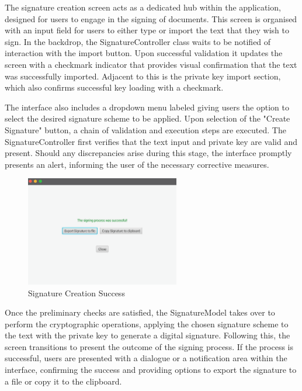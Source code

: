 \documentclass[]{final_report}
\theoremstyle{definition}
\begin{document}
The signature creation screen acts as a dedicated hub within the application, designed for users to engage in the signing of documents. This screen is organised with an input field for users to either type or import the text that they wish to sign. In the backdrop, the SignatureController class waits to be notified of interaction with the import button. Upon successful validation it updates the screen with a checkmark indicator that provides visual confirmation that the text was successfully imported. Adjacent to this is the private key import section, which also confirms successful key loading with a checkmark. 

The interface also includes a dropdown menu labeled giving users the option to select the desired signature scheme  to be applied. 
Upon selection of the "Create Signature" button, a chain of validation and execution steps are executed. The SignatureController first verifies that the text input and private key are valid and present. Should any discrepancies arise during this stage, the interface promptly presents an alert, informing the user of the necessary corrective measures.

\begin{figure}[H]
    \centering
    \includegraphics[width=0.6\textwidth]{poc_pictures/signSuccess.png}
    \caption{Signature Creation Success}
\end{figure}

Once the preliminary checks are satisfied, the SignatureModel takes over to perform the cryptographic operations, applying the chosen signature scheme to the text with the private key to generate a digital signature. Following this, the screen transitions to present the outcome of the signing process. If the process is successful, users are presented with a dialogue or a notification area within the interface, confirming the success and providing options to export the signature to a file or copy it to the clipboard.
\end{document}
